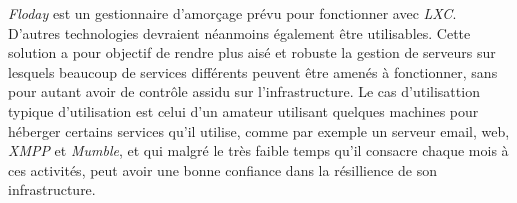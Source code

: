 \emph{Floday} est un gestionnaire d'amorçage prévu pour fonctionner avec \emph{LXC}.
D'autres technologies devraient néanmoins également être utilisables.
Cette solution a pour objectif de rendre plus aisé et robuste la gestion de serveurs sur lesquels beaucoup de services différents peuvent être amenés à fonctionner, sans pour autant avoir de contrôle assidu sur l'infrastructure.
Le cas d'utilisattion typique d'utilisation est celui d'un amateur utilisant quelques machines pour héberger certains services qu'il utilise, comme par exemple un serveur email, web, \emph{XMPP} et \emph{Mumble}, et qui malgré le très faible temps qu'il consacre chaque mois à ces activités, peut avoir une bonne confiance dans la résillience de son infrastructure.
